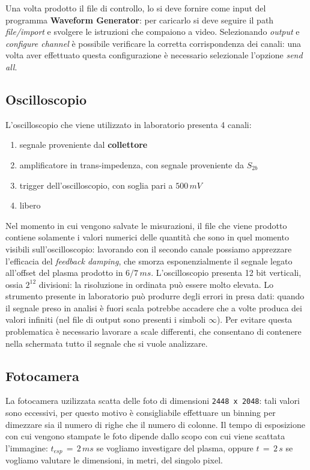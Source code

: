 Una volta prodotto il file di controllo, lo si deve fornire come input del programma \textbf{Waveform Generator}: per caricarlo
si deve seguire il path \textit{file/import} e svolgere le istruzioni che compaiono a video. Selezionando \textit{output} e 
\textit{configure channel} è possibile verificare la corretta corrispondenza dei canali: una volta aver effettuato questa 
configurazione è necessario selezionale l'opzione \textit{send all}.

\subsection{Oscilloscopio}

L'oscilloscopio che viene utilizzato in laboratorio presenta 4 canali:
\begin{enumerate}[itemsep=0pt]
    \item segnale proveniente dal \textbf{collettore} \\
    \item amplificatore in trans-impedenza, con segnale proveniente da \textbf{$S_{2b}$}    \\
    \item trigger dell'oscilloscopio, con soglia pari a $500\,mV$ \\
    \item libero  
\end{enumerate}
Nel momento in cui vengono salvate le misurazioni, il file che viene prodotto contiene solamente i valori numerici 
delle quantità che sono in quel momento visibili sull'oscilloscopio: lavorando con il secondo canale possiamo apprezzare
l'efficacia del \textit{feedback damping}, che smorza esponenzialmente il segnale legato all'offset del plasma prodotto
in $6/7\,ms$. L'oscilloscopio presenta 12 bit verticali, ossia $2^{12}$ divisioni: la  risoluzione in ordinata può essere
molto elevata. Lo strumento presente in laboratorio può produrre degli errori in presa dati: quando il segnale preso in analisi
è fuori scala potrebbe accadere che a volte produca dei valori infiniti (nel file di output sono presenti i simboli $\infty$).
Per evitare questa problematica è necessario lavorare a scale differenti, che consentano di contenere nella schermata tutto
il segnale che si vuole analizzare.

\subsection{Fotocamera}

La fotocamera uzilizzata scatta delle foto di dimensioni \verb|2448 x 2048|: tali valori sono eccessivi, per questo motivo è
consigliabile effettuare un binning per dimezzare sia il numero di righe che il numero di colonne. Il tempo di esposizione
con cui vengono stampate le foto dipende dallo scopo con cui viene scattata l'immagine: $t_{esp}\,=\,2\,ms$ se vogliamo 
investigare del plasma, oppure $t\,=\,2\,s$ se vogliamo valutare le dimensioni, in metri, del singolo pixel.

